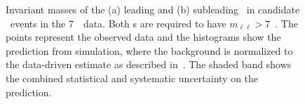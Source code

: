 \begin{figure}[htbp]
    \begin{center}
    \caption[Invariant masses of the (a) leading and (b) subleading \leppair\
    in candidate \ZZ\ events in the 7~\tev\ data.]
    {Invariant masses of the (a) leading and (b) subleading \leppair\
    in candidate \ZZ\ events in the 7~\tev\ data. Both \leppair s are required to have
    $m_{\ell\ell}>7$~\gev.  The points represent the observed data and the
    histograms show the prediction from simulation, where the background is
    normalized to the data-driven estimate as described in~. 
    The shaded band shows the combined statistical and
    systematic uncertainty on the prediction. 
}
    \label{fig:zzdists-Zmass-seven}
\end{center}
\end{figure}

